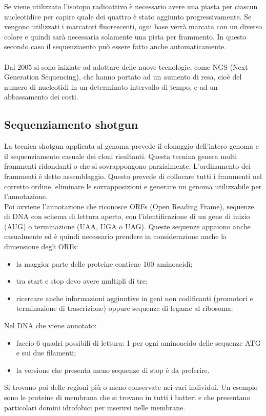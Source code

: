 Se viene utilizzato l'isotopo radioattivo \`e necessario avere una piasta per ciascun nucleotidice per capire quale dei quattro \`e stato aggiunto progressivamente. Se vengono utilizzati i marcatori fluorescenti, ogni base verr\`a marcata con un diverso colore e quindi sar\`a necessaria solamente una pista per frammento. In questo secondo caso il sequenziaento pu\`o essere fatto anche automaticamente. 
\\\\Dal 2005 si sono iniziate ad adottare delle nuove tecnologie, come NGS (Next Generation Sequencing), che hanno portato ad un aumento di resa, cio\`e del numero di nucleotidi in un determinato intervallo di tempo, e ad un abbassamento dei costi.
\subsection{Sequenziamento shotgun}
La tecnica shotgun applicata al genoma prevede il clonaggio dell'intero genoma e il sequenziamento casuale dei cloni risultanti. Questa tecnina genera molti frammenti ridondanti o che si sovrappongono parzialmente. L'ordinamento dei frammenti \`e detto assemblaggio. Questo prevede di collocare tutti i frammenti nel corretto ordine, eliminare le sovrapposizioni e generare un genoma utilizzabile per l'annotazione.
\\Poi avviene l'annotazione che riconosce ORFs (Open Reading Frame), sequenze di DNA con schema di lettura aperto, con l'identificazione di un gene di inizio (AUG) o terminazione (UAA, UGA o UAG). Queste sequenze appaiono anche casualmente ed \`e quindi necessario prendere in considerazione anche la dimensione degli ORFs:
\begin{itemize}
    \item la maggior parte delle proteine contiene 100 aminoacidi; 
    \item tra start e stop devo avere multipli di tre;
    \item ricercare anche informazioni aggiuntive in geni non codificanti (promotori e terminazione di trascrizione) oppure sequenze di legame al ribosoma.
\end{itemize}
Nel DNA che viene annotato:
\begin{itemize}
    \item faccio 6 quadri possibili di lettura: 1 per ogni aminoacido delle sequenze ATG e sui due filamenti; 
    \item la versione che presenta meno sequenze di stop \`e da preferire. 
\end{itemize}
Si trovano poi delle regioni pi\`u o meno conservate nei vari individui. Un esempio sono le proteine di membrana che si trovano in tutti i batteri e che presentano particolari domini idrofobici per inserirsi nelle membrane. 

